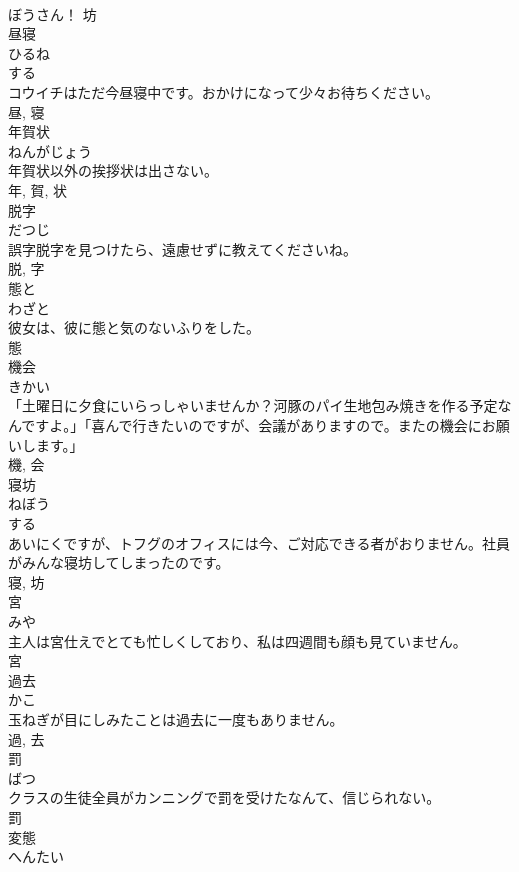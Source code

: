 \documentclass[8pt]{extreport}
\begin{document}
\begin{CJK}{UTF8}{min}
\\	ぼうさん！	坊	
\\	昼寝	
\\	ひるね	
\\	する 
\\	コウイチはただ今昼寝中です。おかけになって少々お待ちください。	
\\	昼, 寝	
\\	年賀状	
\\	ねんがじょう	
\\	年賀状以外の挨拶状は出さない。	
\\	年, 賀, 状	
\\	脱字	
\\	だつじ	
\\	誤字脱字を見つけたら、遠慮せずに教えてくださいね。	
\\	脱, 字	
\\	態と	
\\	わざと	
\\	彼女は、彼に態と気のないふりをした。	
\\	態	
\\	機会	
\\	きかい	
\\	「土曜日に夕食にいらっしゃいませんか？河豚のパイ生地包み焼きを作る予定なんですよ。」「喜んで行きたいのですが、会議がありますので。またの機会にお願いします。」	
\\	機, 会	
\\	寝坊	
\\	ねぼう	
\\	する 
\\	あいにくですが、トフグのオフィスには今、ご対応できる者がおりません。社員がみんな寝坊してしまったのです。	
\\	寝, 坊	
\\	宮	
\\	みや	
\\	主人は宮仕えでとても忙しくしており、私は四週間も顔も見ていません。	
\\	宮	
\\	過去	
\\	かこ	
\\	玉ねぎが目にしみたことは過去に一度もありません。	
\\	過, 去	
\\	罰	
\\	ばつ	
\\	クラスの生徒全員がカンニングで罰を受けたなんて、信じられない。	
\\	罰	
\\	変態	
\\	へんたい	

\end{CJK}
\end{document}
